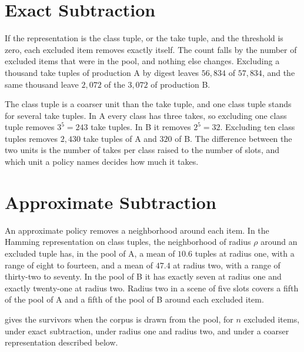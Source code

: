 \documentclass[11pt,twoside,openright]{book}
\theoremstyle{plain}
\theoremstyle{definition}
\theoremstyle{remark}
\begin{document}
\section{Exact Subtraction}\label{sec:exact15}

If the representation is the class tuple, or the take tuple, and the threshold is zero, each excluded item removes exactly itself. The count falls by the number of excluded items that were in the pool, and nothing else changes. Excluding a thousand take tuples of production A by digest leaves $56{,}834$ of $57{,}834$, and the same thousand leave $2{,}072$ of the $3{,}072$ of production B.

The class tuple is a coarser unit than the take tuple, and one class tuple stands for several take tuples. In A every class has three takes, so excluding one class tuple removes $3^5=243$ take tuples. In B it removes $2^5=32$. Excluding ten class tuples removes $2{,}430$ take tuples of A and $320$ of B. The difference between the two units is the number of takes per class raised to the number of slots, and which unit a policy names decides how much it takes.

\section{Approximate Subtraction}\label{sec:approx15}

An approximate policy removes a neighborhood around each item. In the Hamming representation on class tuples, the neighborhood of radius $\rho$ around an excluded tuple has, in the pool of A, a mean of $10.6$ tuples at radius one, with a range of eight to fourteen, and a mean of $47.4$ at radius two, with a range of thirty-two to seventy. In the pool of B it has exactly seven at radius one and exactly twenty-one at radius two. Radius two in a scene of five slots covers a fifth of the pool of A and a fifth of the pool of B around each excluded item.

 gives the survivors when the corpus is drawn from the pool, for $n$ excluded items, under exact subtraction, under radius one and radius two, and under a coarser representation described below.
\end{document}
